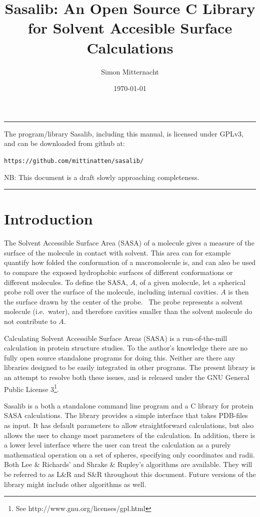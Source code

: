 \documentclass[a4paper,11pt]{article}
\author{Simon Mitternacht}
\date{\today}
\title{Sasalib: An Open Source C Library for Solvent Accesible Surface
  Calculations}
\begin{document}
\maketitle
\hrule\vspace{0.5cm}
\noindent
The program/library Sasalib, including this manual, is licensed under
GPLv3, and can be downloaded from github at: 
\begin{center}
\texttt{https://github.com/mittinatten/sasalib/}
\end{center}
NB: This document is a draft slowly approaching completeness.
\vspace{0.5cm}
\hrule
\section{Introduction}
The Solvent Accessible Surface Area (SASA) of a molecule gives a
measure of the surface of the molecule in contact with solvent. This
area can for example quantify how folded the conformation of a
macromolecule is, and can also be used to compare the exposed
hydrophobic surfaces of different conformations or different
molecules. To define the SASA, $A$, of a given molecule, let a spherical
probe roll over the surface of the molecule, including internal
cavities. $A$ is then the surface drawn by the center of the
probe.~\cite{LnR} The probe represents a solvent molecule
(i.e.\ water), and therefore cavities smaller than the solvent
molecule do not contribute to $A$.

Calculating Solvent Accessible Surface Areas (SASA) is a
run-of-the-mill calculation in protein structure studies. To the
author's knowledge there are no fully open source standalone programs
for doing this. Neither are there any libraries designed to be easily
integrated in other programs. The present library is an attempt to
resolve both these issues, and is released under the GNU General
Public License 3\footnote{See http://www.gnu.org/licenses/gpl.html}.

Sasalib is a both a standalone command line program and a C library
for protein SASA calculations. The library provides a simple interface
that takes PDB-files as input. It has default parameters to allow
straightforward calculations, but also allows the user to change most
parameters of the calculation. In addition, there is a lower level
interface where the user can treat the calculation as a purely
mathematical operation on a set of spheres, specifying only
coordinates and radii. Both Lee \& Richards' \cite{LnR} and Shrake \&
Rupley's \cite{SnR} algorithms are available. They will be referred to
as L\&R and S\&R throughout this document. Future versions of the
library might include other algorithms as well.
\end{document}
